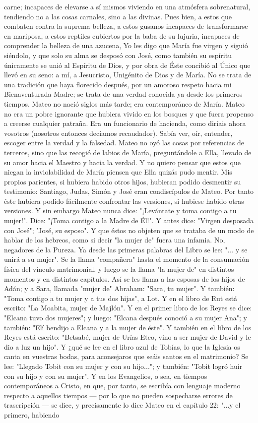 \documentclass[12pt, twoside, openright]{book} %
\begin{document}
carne; incapaces de elevarse a sí mismos viviendo en una atmósfera sobrenatural, tendiendo no a las cosas carnales, sino a las divinas. Pues bien, a estos que combaten contra la suprema belleza, a estos gusanos incapaces de transformarse en mariposa, a estos reptiles cubiertos por la baba de su lujuria, incapaces de comprender la belleza de una azucena, Yo les digo que María fue virgen y siguió siéndolo, y que solo su alma se desposó con José, como también su espíritu únicamente se unió al Espíritu de Dios, y por obra de Éste concibió al Único que llevó en su seno: a mí, a Jesucristo, Unigénito de Dios y de María. No se trata de una tradición que haya florecido después, por un amoroso respeto hacia mi Bienaventurada Madre; se trata de una verdad conocida ya desde los primeros tiempos. Mateo no nació siglos más tarde; era contemporáneo de María. Mateo no era un pobre ignorante que hubiera vivido en los bosques y que fuera propenso a creerse cualquier patraña. Era un funcionario de hacienda, como diríais ahora vosotros (nosotros entonces decíamos recaudador). Sabía ver, oír, entender, escoger entre la verdad y la falsedad. Mateo no oyó las cosas por referencias de terceros, sino que las recogió de labios de María, preguntándole a Ella, llevado de su amor hacia el Maestro y hacia la verdad. Y no quiero pensar que estos que niegan la inviolabilidad de María piensen que Ella quizás pudo mentir. Mis propios parientes, si hubiera habido otros hijos, hubieran podido desmentir su testimonio: Santiago, Judas, Simón y José eran condiscípulos de Mateo. Por tanto éste hubiera podido fácilmente confrontar las versiones, si hubiese habido otras versiones. Y sin embargo Mateo nunca dice: "¡Levántate y toma contigo a tu mujer!". Dice: "¡Toma contigo a la Madre de Él!". Y antes dice: "Virgen desposada con José"; 'José, su esposo". Y que éstos no objeten que se trataba de un modo de hablar de los hebreos, como si decir "la mujer de" fuera una infamia. No, negadores de la Pureza. Ya desde las primeras palabras del Libro se lee: "... y se unirá a su mujer". Se la llama "compañera" hasta el momento de la consumación física del vínculo matrimonial, y luego se la llama "la mujer de" en distintos momentos y en distintos capítulos. Así se les llama a las esposas de los hijos de Adán; y a Sara, llamada "mujer de" Abraham: "Sara, tu mujer". Y también: "Toma contigo a tu mujer y a tus dos hijas", a Lot. Y en el libro de Rut está escrito: "La Moabita, mujer de Majlón". Y en el primer libro de los Reyes se dice: "Elcana tuvo dos mujeres"; y luego: "Elcana después conoció a su mujer Ana"; y también: "Elí bendijo a Elcana y a la mujer de éste". Y también en el libro de los Reyes está escrito: "Betsabé, mujer de Urías Eteo, vino a ser mujer de David y le dio a luz un hijo". Y ¿qué se lee en el libro azul de Tobías, lo que la Iglesia os canta en vuestras bodas, para aconsejaros que seáis santos en el matrimonio? Se lee: "Llegado Tobit con su mujer y con su hijo..."; y también: "Tobit logró huir con su hijo y con su mujer". Y en los Evangelios, o sea, en tiempos contemporáneos a Cristo, en que, por tanto, se escribía con lenguaje moderno respecto a aquellos tiempos — por lo que no pueden sospecharse errores de trascripción — se dice, y precisamente lo dice Mateo en el capítulo 22: "...y el primero, habiendo 
\end{document}
